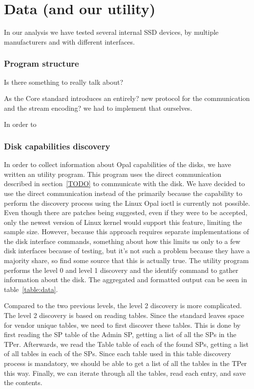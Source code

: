 
\chapter{Data (and our utility)}

In our analysis we have tested several internal SSD devices, by multiple manufacturers and with different interfaces.

\subsection{Program structure}

Is there something to really talk about? 

As the Core standard introduces an entirely? new protocol for the communication and the stream encoding? we had to implement that ourselves.

In order to 

\subsection{Disk capabilities discovery}


In order to collect information about Opal capabilities of the disks, we have written an utility program. This program uses the direct communication described in section~\ref{TODO} to communicate with the disk. We have decided to use the direct communication instead of the primarily because the capability to perform the discovery process using the Linux Opal ioctl is currently not possible. Even though there are patches being suggested, even if they were to be accepted, only the newest version of Linux kernel would support this feature, limiting the sample size.
However, because this approach requires separate implementations of the disk interface commands, something about how this limits us only to a few disk interfaces because of testing, but it's not such a problem because they have a majority share, so find some source that this is actually true.
The utility program performs the level 0 and level 1 discovery and the identify command to gather information about the disk.
The aggregated and formatted output can be seen in table~\ref{table:data}.

Compared to the two previous levels, the level 2 discovery is more complicated. The level 2 discovery is based on reading tables. Since the standard leaves space for vendor unique tables, we need to first discover these tables. This is done by first reading the SP table of the Admin SP, getting a list of all the SPs in the TPer. Afterwards, we read the Table table of each of the found SPs, getting a list of all tables in each of the SPs. Since each table used in this table discovery process is mandatory, we should be able to get a list of all the tables in the TPer this way. Finally, we can iterate through all the tables, read each entry, and save the contents.

